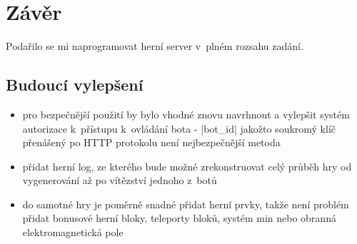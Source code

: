 
\section*{Závěr}

Podařilo se mi naprogramovat herní server v~plném rozsahu zadání.

\subsection*{Budoucí vylepšení}

\begin{itemize}
 \item pro bezpečnější použití by bylo vhodné znovu navrhnout a vylepšit systém autorizace k~přístupu k~ovládání bota - \ic|bot_id| jakožto soukromý klíč přenášený po HTTP protokolu není nejbezpečnější metoda
 \item přidat herní log, ze kterého bude možné zrekonstruovat celý průběh hry od vygenerování až po vítězství jednoho z~botů  
 \item do samotné hry je poměrně snadné přidat herní prvky, takže není problém přidat bonusové herní bloky, teleporty bloků, systém min nebo obranná elektromagnetická pole
\end{itemize}

